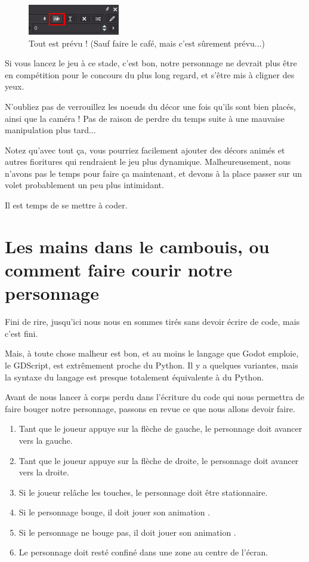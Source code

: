 \begin{figure}
  \begin{center}
    \includegraphics[width=4cm]{img/lvl1-autoplay.png}
  \end{center}
  \caption{\label{lvl1-autoplay} Tout est prévu ! (Sauf faire le café, mais c'est sûrement prévu...)}
\end{figure}

Si vous lancez le jeu à ce stade, c'est bon, notre personnage ne devrait plus être en compétition pour le concours du plus long regard, et s'être mis à cligner des yeux.

N'oubliez pas de verrouillez les noeuds du décor une fois qu'ils sont bien placés, ainsi que la caméra ! Pas de raison de perdre du temps suite à une mauvaise manipulation plus tard...

Notez qu'avec tout ça, vous pourriez facilement ajouter des décors animés et autres fioritures qui rendraient le jeu plus dynamique. Malheureusement, nous n'avons pas le temps pour faire ça maintenant, et devons à la place passer sur un volet probablement un peu plus intimidant.

Il est temps de se mettre à coder.

\section{Les mains dans le cambouis, ou comment faire courir notre personnage}

Fini de rire, jusqu'ici nous nous en sommes tirés sans devoir écrire de code, mais c'est fini. 

Mais, à toute chose malheur est bon, et au moins le langage que Godot emploie, le GDScript, est extrêmement proche du Python. Il y a quelques variantes, mais la syntaxe du langage est presque totalement équivalente à du Python.

Avant de nous lancer à corps perdu dans l'écriture du code qui nous permettra de faire bouger notre personnage, passons en revue ce que nous allons devoir faire.

\begin{enumerate}
\item Tant que le joueur appuye sur la flèche de gauche, le personnage doit avancer vers la gauche.
\item Tant que le joueur appuye sur la flèche de droite, le personnage doit avancer vers la droite.
\item Si le joueur relâche les touches, le personnage doit être stationnaire.
\item Si le personnage bouge, il doit jouer son animation .
\item Si le personnage ne bouge pas, il doit jouer son animation .
\item Le personnage doit resté confiné dans une zone au centre de l'écran.
\end{enumerate}

